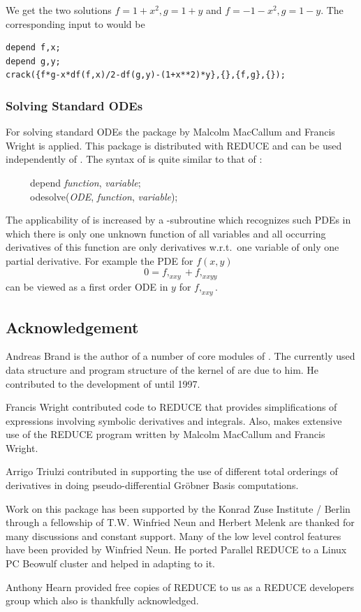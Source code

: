 We get the two solutions $f = 1 + x^2, g = 1 + y$ and $f = - 1 - x^2,
g = 1 - y$.  The corresponding input to  would be
\begin{verbatim}
depend f,x;
depend g,y;
crack({f*g-x*df(f,x)/2-df(g,y)-(1+x**2)*y},{},{f,g},{});
\end{verbatim}

\subsubsection{Solving Standard ODEs}

For solving standard ODEs the package  by Malcolm
MacCallum and Francis Wright \cite{MacCallum:1989} is applied.  This
package is distributed with REDUCE and can be used independently of
.  The syntax of  is quite similar to
that of :
\begin{flushleft}\ttfamily
~~~~~depend \textit{function}, \textit{variable}; \\
~~~~~odesolve(\textit{ODE}, \textit{function}, \textit{variable});
\end{flushleft}
The applicability of  is increased by a
-subroutine which recognizes such PDEs in which there
is only one unknown function of all variables and all occurring
derivatives of this function are only derivatives w.r.t.\ one variable
of only one partial derivative.  For example the PDE for $f(x,y)$
\[ 0 = f,_{xxy} + f,_{xxyy} \]
can be viewed as a first order ODE in $y$ for $f,_{xxy}$.

\subsection*{Acknowledgement}

Andreas Brand is the author of a number of core modules of
.  The currently used data structure and program
structure of the kernel of  are due to him.  He
contributed to the development of  until 1997.

Francis Wright contributed code to REDUCE that provides
simplifications of expressions involving symbolic derivatives and
integrals.  Also,  makes extensive use of the REDUCE
program  written by Malcolm MacCallum and Francis
Wright.

Arrigo Triulzi contributed in supporting the use of different total
orderings of derivatives in doing pseudo-differential Gr\"{o}bner
Basis computations.

Work on this package has been supported by the Konrad Zuse Institute /
Berlin through a fellowship of T.W\@.  Winfried Neun and Herbert Melenk
are thanked for many discussions and constant support.  Many of the
low level control features have been provided by Winfried Neun.  He
ported Parallel REDUCE to a Linux PC Beowulf cluster and helped in
adapting  to it.

Anthony Hearn provided free copies of REDUCE to us as a REDUCE
developers group which also is thankfully acknowledged.
